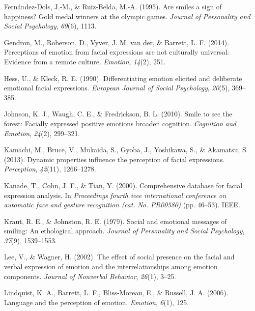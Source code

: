 \documentclass[man]{apa6}
\begin{document}
\leavevmode\hypertarget{ref-fernandez1995smiles}{}%
Fernández-Dols, J.-M., \& Ruiz-Belda, M.-A. (1995). Are smiles a sign of happiness? Gold medal winners at the olympic games. \emph{Journal of Personality and Social Psychology}, \emph{69}(6), 1113.

\leavevmode\hypertarget{ref-gendron2014perceptions}{}%
Gendron, M., Roberson, D., Vyver, J. M. van der, \& Barrett, L. F. (2014). Perceptions of emotion from facial expressions are not culturally universal: Evidence from a remote culture. \emph{Emotion}, \emph{14}(2), 251.

\leavevmode\hypertarget{ref-hess1990differentiating}{}%
Hess, U., \& Kleck, R. E. (1990). Differentiating emotion elicited and deliberate emotional facial expressions. \emph{European Journal of Social Psychology}, \emph{20}(5), 369--385.

\leavevmode\hypertarget{ref-johnson2010smile}{}%
Johnson, K. J., Waugh, C. E., \& Fredrickson, B. L. (2010). Smile to see the forest: Facially expressed positive emotions broaden cognition. \emph{Cognition and Emotion}, \emph{24}(2), 299--321.

\leavevmode\hypertarget{ref-kamachi2013dynamic}{}%
Kamachi, M., Bruce, V., Mukaida, S., Gyoba, J., Yoshikawa, S., \& Akamatsu, S. (2013). Dynamic properties influence the perception of facial expressions. \emph{Perception}, \emph{42}(11), 1266--1278.

\leavevmode\hypertarget{ref-kanade2000comprehensive}{}%
Kanade, T., Cohn, J. F., \& Tian, Y. (2000). Comprehensive database for facial expression analysis. In \emph{Proceedings fourth ieee international conference on automatic face and gesture recognition (cat. No. PR00580)} (pp. 46--53). IEEE.

\leavevmode\hypertarget{ref-kraut1979social}{}%
Kraut, R. E., \& Johnston, R. E. (1979). Social and emotional messages of smiling: An ethological approach. \emph{Journal of Personality and Social Psychology}, \emph{37}(9), 1539--1553.

\leavevmode\hypertarget{ref-lee2002effect}{}%
Lee, V., \& Wagner, H. (2002). The effect of social presence on the facial and verbal expression of emotion and the interrelationships among emotion components. \emph{Journal of Nonverbal Behavior}, \emph{26}(1), 3--25.

\leavevmode\hypertarget{ref-lindquist2006language}{}%
Lindquist, K. A., Barrett, L. F., Bliss-Moreau, E., \& Russell, J. A. (2006). Language and the perception of emotion. \emph{Emotion}, \emph{6}(1), 125.
\end{document}
